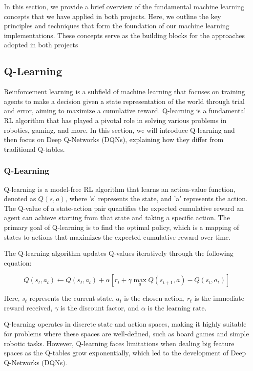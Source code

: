 
In this section, we provide a brief overview of the fundamental machine learning concepts that we 
have applied in both projects. Here, we outline the key principles and techniques that form the foundation 
of our machine learning implementations. These concepts serve as the building blocks for the approaches adopted in both projects

\subsection{Q-Learning}

Reinforcement learning is a subfield of machine learning that focuses on training agents to make a decision given a state representation of the world through trial and error, aiming to maximize a cumulative reward. Q-learning is a fundamental RL algorithm that has played a pivotal role in solving various problems in robotics, gaming, and more. In this section, we will introduce Q-learning and then focus on Deep Q-Networks (DQNs), explaining how they differ from traditional Q-tables.

\subsubsection{Q-Learning}

Q-learning is a model-free RL algorithm that learns an action-value function, denoted as \(Q(s, a)\), where 's' represents the state, and 'a' represents the action. The Q-value of a state-action pair quantifies the expected cumulative reward an agent can achieve starting from that state and taking a specific action. The primary goal of Q-learning is to find the optimal policy, which is a mapping of states to actions that maximizes the expected cumulative reward over time.

The Q-learning algorithm updates Q-values iteratively through the following equation:

\begin{equation}
	Q(s_t, a_t) \leftarrow Q(s_t, a_t) + \alpha \left[ r_t + \gamma \max_a Q(s_{t+1}, a) - Q(s_t, a_t) \right]
\end{equation}

Here, \(s_t\) represents the current state, \(a_t\) is the chosen action, \(r_t\) is the immediate reward received, \(\gamma\) is the discount factor, and \(\alpha\) is the learning rate.

Q-learning operates in discrete state and action spaces, making it highly suitable for problems where these spaces are well-defined, such as board games and simple robotic tasks. However, Q-learning faces limitations when dealing big feature spaces as the Q-tables grow exponentially, which led to the development of Deep Q-Networks (DQNs).

